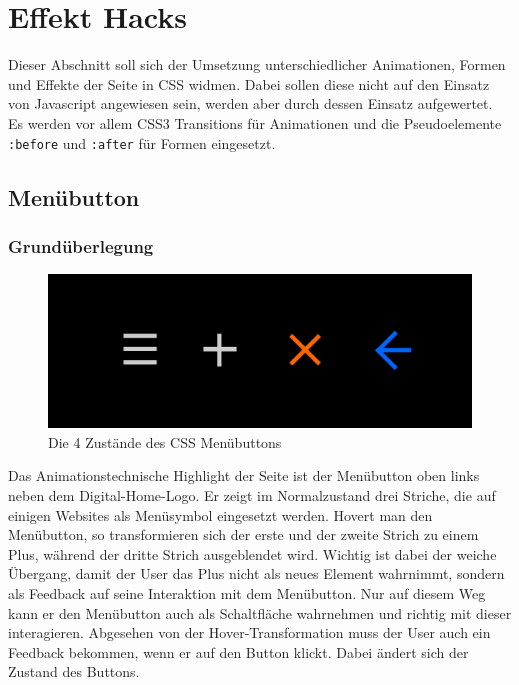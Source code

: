 \section{Effekt Hacks}

Dieser Abschnitt soll sich der Umsetzung unterschiedlicher Animationen, Formen und Effekte der Seite in CSS widmen. Dabei sollen diese nicht auf den Einsatz von Javascript angewiesen sein, werden aber durch dessen Einsatz aufgewertet.
Es werden vor allem CSS3 Transitions für Animationen und die Pseudoelemente \lstinline{:before} und \lstinline{:after} für Formen eingesetzt.
\subsection{Menübutton}
\subsubsection{Grundüberlegung}

\begin{figure} [h]
\includegraphics[width=\textwidth]{./img/css_buttons1.png}
\caption{Die 4 Zustände des CSS Menübuttons}
\label{css_buttons1}
\end{figure}

Das Animationstechnische Highlight der Seite ist der Menübutton oben links neben dem Digital-Home-Logo. Er zeigt im Normalzustand drei Striche, die auf einigen Websites als Menüsymbol eingesetzt werden. Hovert man den Menübutton, so transformieren sich der erste und der zweite Strich zu einem Plus, während der dritte Strich ausgeblendet wird. Wichtig ist dabei der weiche Übergang, damit der User das Plus nicht als neues Element wahrnimmt, sondern als Feedback auf seine Interaktion mit dem Menübutton. Nur auf diesem Weg kann er den Menübutton auch als Schaltfläche wahrnehmen und richtig mit dieser interagieren. Abgesehen von der Hover-Transformation muss der User auch ein Feedback bekommen, wenn er auf den Button klickt. Dabei ändert sich der Zustand des Buttons.


